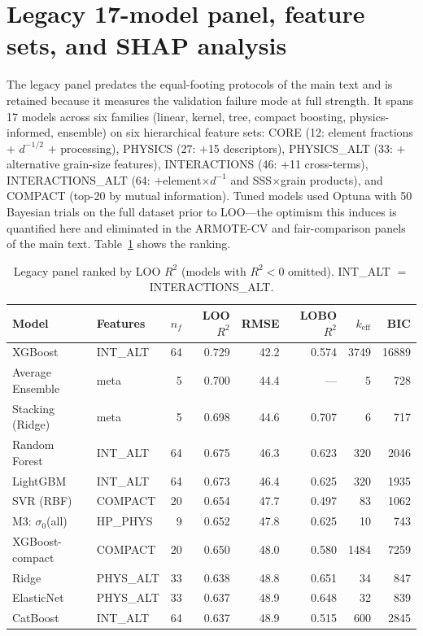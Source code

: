 \documentclass[11pt]{article}
\begin{document}
\section{Legacy 17-model panel, feature sets, and SHAP analysis}
\label{si:mlpanel}

The legacy panel predates the equal-footing protocols of the main text and is retained because it measures the validation failure mode at full strength. It spans 17 models across six families (linear, kernel, tree, compact boosting, physics-informed, ensemble) on six hierarchical feature sets: CORE (12: element fractions $+$ $d^{-1/2}$ $+$ processing), PHYSICS (27: $+$15 descriptors), PHYSICS\_ALT (33: $+$alternative grain-size features), INTERACTIONS (46: $+$11 cross-terms), INTERACTIONS\_ALT (64: $+$element$\times d^{-1}$ and SSS$\times$grain products), and COMPACT (top-20 by mutual information). Tuned models used Optuna with 50 Bayesian trials on the full dataset prior to LOO---the optimism this induces is quantified here and eliminated in the ARMOTE-CV and fair-comparison panels of the main text. Table~\ref{tab:models} shows the ranking.

\begin{table}[htb]
\centering
\caption{Legacy panel ranked by LOO $R^2$ (models with $R^2 < 0$ omitted). INT\_ALT $=$ INTERACTIONS\_ALT.}
\label{tab:models}
\small
\begin{tabular}{llrrrrrr}
\toprule
Model & Features & $n_f$ & LOO $R^2$ & RMSE & LOBO $R^2$ & $k_\text{eff}$ & BIC \\
\midrule
XGBoost & INT\_ALT & 64 & 0.729 & 42.2 & 0.574 & 3749 & 16889 \\
Average Ensemble & meta & 5 & 0.700 & 44.4 & --- & 5 & 728 \\
Stacking (Ridge) & meta & 5 & 0.698 & 44.6 & 0.707 & 6 & 717 \\
Random Forest & INT\_ALT & 64 & 0.675 & 46.3 & 0.623 & 320 & 2046 \\
LightGBM & INT\_ALT & 64 & 0.673 & 46.4 & 0.625 & 320 & 1935 \\
SVR (RBF) & COMPACT & 20 & 0.654 & 47.7 & 0.497 & 83 & 1062 \\
M3: $\sigma_0$(all) & HP\_PHYS & 9 & 0.652 & 47.8 & 0.625 & 10 & 743 \\
XGBoost-compact & COMPACT & 20 & 0.650 & 48.0 & 0.580 & 1484 & 7259 \\
Ridge & PHYS\_ALT & 33 & 0.638 & 48.8 & 0.651 & 34 & 847 \\
ElasticNet & PHYS\_ALT & 33 & 0.637 & 48.9 & 0.648 & 32 & 839 \\
CatBoost & INT\_ALT & 64 & 0.637 & 48.9 & 0.515 & 600 & 2845 \\
\bottomrule
\end{tabular}
\end{table}
\end{document}
